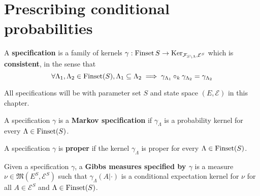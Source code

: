 \section{Prescribing conditional probabilities}

\begin{definition}[Specification]
    \label{def:specification}
    \leanok

    A {\bf specification} is a family of kernels $\gamma : \operatorname{Finset} S \to \operatorname{Ker}_{\mathcal{F}_{S\setminus\Lambda}, \mathcal{E}^S}$ which is {\bf consistent}, in the sense that
    $$\forall \Lambda_1, \Lambda_2 \in \operatorname{Finset}(S), \Lambda_1 \subseteq \Lambda_2 \implies \gamma_{\Lambda_1} \circ_k \gamma_{\Lambda_2} = \gamma_{\Lambda_2}$$
\end{definition}

All specifications will be with parameter set $S$ and state space $(E, \mathcal{E})$ in this chapter.

\begin{definition}
    \label{def:markov-specification}
    \leanok

    A specification $\gamma$ is a \textbf{Markov specification} if $\gamma_\Lambda$ is a probability kernel for every $\Lambda \in \operatorname{Finset}(S)$.
\end{definition}

\begin{definition}
    \label{def:proper-specification}
    \leanok

    A specification $\gamma$ is \textbf{proper} if the kernel $\gamma_\Lambda$ is proper for every $\Lambda \in \operatorname{Finset}(S)$.
\end{definition}

\begin{definition}
    \label{def:gibbs-meas}
    \leanok
    Given a specification $\gamma$, a \textbf{Gibbs measures specified by $\gamma$} is a measure $\nu \in \mathfrak{M}(E^S, \mathcal{E}^S)$ such that $\gamma_\Lambda(A|\cdot)$ is a conditional expectation kernel for $\nu$ for all $A \in \mathcal E^S$ and $\Lambda \in \operatorname{Finset}(S)$.
\end{definition}

